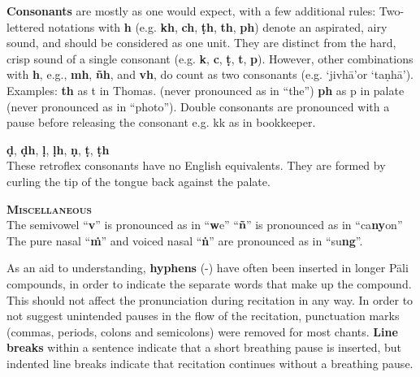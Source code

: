 \begin{justify}
  \textbf{Consonants} are mostly as one would expect, with a few additional rules: Two-lettered notations with \textbf{h} (e.g. \textbf{kh}, \textbf{ch}, \textbf{ṭh}, \textbf{th}, \textbf{ph}) denote an aspirated, airy sound, and should be considered as one unit. They are distinct from the hard, crisp sound of a single consonant (e.g. \textbf{k}, \textbf{c}, \textbf{ṭ}, \textbf{t}, \textbf{p}). However, other combinations with \textbf{h}, e.g., \textbf{mh}, \textbf{ñh}, and \textbf{vh}, do count as two consonants (e.g. `jivhā'or `taṇhā').  Examples: \textbf{th} as t in Thomas. (never pronounced as in ``the'') \textbf{ph} as p in palate (never pronounced as in ``photo''). Double consonants are pronounced with a pause before releasing the consonant e.g. kk as in bookkeeper.
\end{justify}

\begin{justify}
  \textbf{ḍ}, \textbf{ḍh}, \textbf{ḷ}, \textbf{ḷh}, \textbf{ṇ}, \textbf{ṭ}, \textbf{ṭh}\\
  These retroflex consonants have no English equivalents. They are formed by curling the tip of the tongue back against the palate.
\end{justify}

\begin{justify}
  \textbf{\textsc{Miscellaneous}}\\
  The semivowel ``\textbf{v}'' is pronounced as in ``\textbf{w}e'' ``\textbf{ñ}'' is pronounced as in ``ca\textbf{ny}on'' The pure nasal ``\textbf{ṁ}'' and voiced nasal ``\textbf{ṅ}'' are pronounced as in ``su\textbf{ng}''.
\end{justify}

\begin{justify}
  As an aid to understanding, \textbf{hyphens} (-) have often been inserted in longer Pāli compounds, in order to indicate the separate words that make up the compound. This should not affect the pronunciation during recitation in any way. In order to not suggest unintended pauses in the flow of the recitation, punctuation marks (commas, periods, colons and semicolons) were removed for most chants. \textbf{Line breaks} within a sentence indicate that a short breathing pause is inserted, but indented line breaks indicate that recitation continues without a breathing pause.
\end{justify}

